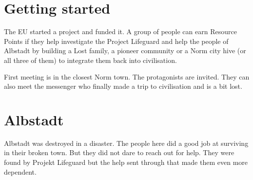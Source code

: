 \section{Getting started}

The EU started a project and funded it. A group of people can earn Resource Points if they help investigate the Project Lifeguard and help the people of Albstadt by building a Lost family, a pioneer community or a Norm city hive (or all three of them) to integrate them back into civilisation.

First meeting is in the closest Norm town. The protagonists are invited. They can also meet the messenger who finally made a trip to civilisation and is a bit lost.

\section{Albstadt}

Albstadt was destroyed in a disaster.
The people here did a good job at surviving in their broken town. But they did not dare to reach out for help. They were found by Projekt Lifeguard but the help sent through that made them even more dependent.